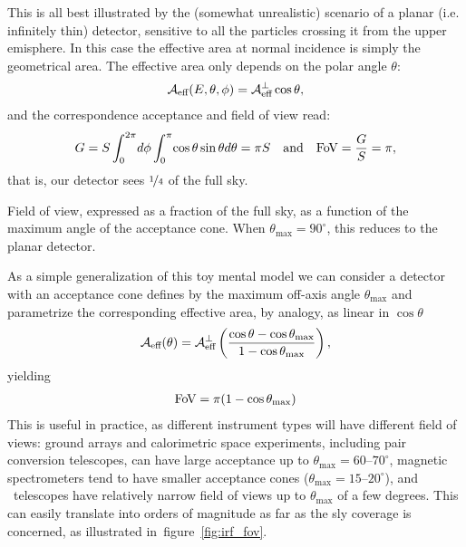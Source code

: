 This is all best illustrated by the (somewhat unrealistic) scenario of a planar
(i.e. infinitely thin) detector, sensitive to all the particles crossing it from
the upper emisphere. In this case the effective area at normal incidence is simply
the geometrical area. The effective area only depends on the polar angle $\theta$:
\begin{align}
  \mathcal{A}_\text{eff}(E, \theta, \phi) = \mathcal{A}_\text{eff}^{\perp} \cos\theta,
\end{align}
and the correspondence acceptance and field of view read:
\begin{align}
  G = S\int_0^{2\pi}\!d\phi
  \int_0^\pi \!\cos\theta\sin\theta d\theta = \pi S
  \quad\text{and}\quad
  \text{Fo\kern-1ptV} = \frac{G}{S} = \pi,
\end{align}
that is, our detector sees $\nicefrac{1}{4}$ of the full sky.

\begin{marginfigure}
  
  \caption{Field of view, expressed as a fraction of the full sky, as a function
  of the maximum angle of the acceptance cone. When $\theta_\text{max} = 90^\circ$,
  this reduces to the planar detector.}
  \label{fig:irf_fov}
\end{marginfigure}

As a simple generalization of this toy mental model we can consider a detector
with an acceptance cone defines by the maximum off-axis angle $\theta_\text{max}$
and parametrize the corresponding effective area, by analogy, as linear in $\cos\theta$
\begin{align*}
  \mathcal{A}_\text{eff}(\theta) = \mathcal{A}_\text{eff}^{\perp}
  \left(\frac{\cos\theta - \cos\theta_\text{max}}{1 - \cos\theta_\text{max}}\right),
\end{align*}
yielding
\begin{align}
  \text{Fo\kern-1ptV} = \pi (1 - \cos\theta_\text{max})
\end{align}
This is useful in practice, as different instrument types will have different
field of views: ground arrays and calorimetric space experiments, including
pair conversion telescopes, can have large acceptance up to
$\theta_\text{max} = 60$--$70^\circ$, magnetic spectrometers tend to have
smaller acceptance cones ($\theta_\text{max} = 15$--$20^\circ$), and \cherenkov\
telescopes have relatively narrow field of views up to $\theta_\text{max}$ of a
few degrees. This can easily translate into orders of magnitude as far as the
sly coverage is concerned, as illustrated in~figure~\ref{fig:irf_fov}.

